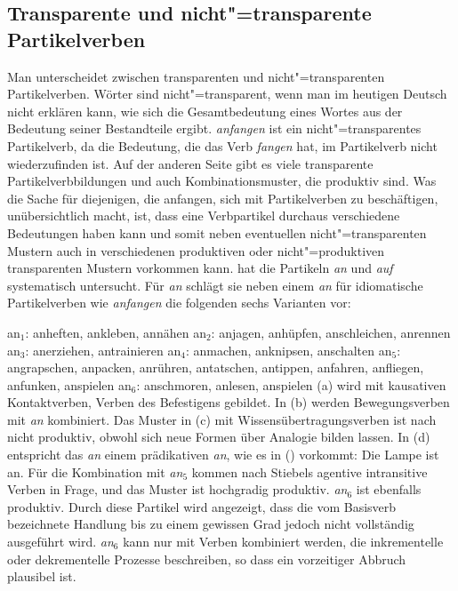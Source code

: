 \subsection{Transparente und nicht"=transparente Partikelverben}
\label{sec-transparente-und-nicht-transparente-Partikelverben}

Man unterscheidet zwischen transparenten und nicht"=transparenten Partikelverben. Wörter
sind nicht"=transparent, wenn man im heutigen Deutsch nicht erklären kann, wie sich die
Gesamtbedeutung eines Wortes aus der Bedeutung seiner Bestandteile ergibt. \emph{anfangen}
ist \zb ein nicht"=transparentes Partikelverb, da die Bedeutung, die das Verb \emph{fangen}
hat, im Partikelverb nicht wiederzufinden ist. Auf der anderen Seite gibt es viele transparente
Partikelverbbildungen und auch Kombinationsmuster, die produktiv sind. Was die Sache
für diejenigen, die anfangen, sich mit Partikelverben zu beschäftigen, unübersichtlich macht, ist,
dass eine Verbpartikel durchaus verschiedene Bedeutungen haben kann und somit
neben eventuellen nicht"=transparenten Mustern auch in verschiedenen
produktiven oder nicht"=produktiven transparenten Mustern vorkommen kann.
\citet{Stiebels96a} hat die Partikeln \emph{an} und \emph{auf} systematisch untersucht.
Für \emph{an} schlägt sie neben einem \emph{an} für idiomatische Partikelverben wie \emph{anfangen}
die folgenden sechs Varianten vor:

\eal
\label{verschiedene-ans}
\ex an$_1$: anheften, ankleben, annähen                           
\ex an$_2$: anjagen,  anhüpfen, anschleichen, anrennen            
\ex an$_3$: anerziehen, antrainieren                              
\ex an$_4$: anmachen, anknipsen, anschalten                       
\ex an$_5$: angrapschen, anpacken, anrühren, antatschen, antippen,
            anfahren, anfliegen, anfunken, anspielen              
\ex an$_6$: anschmoren, anlesen, anspielen                        
\zl
(a) wird mit kausativen Kontaktverben, Verben des Befestigens gebildet. In
(b)
werden Bewegungsverben mit \emph{an} kombiniert. Das Muster in (c) mit Wissensübertragungsverben
ist nach \citet[]{Stiebels96a} nicht produktiv, obwohl sich neue Formen über Analogie bilden lassen.
In (d) entspricht das \emph{an} einem prädikativen \emph{an}, wie es in () vorkommt:
\ea
Die Lampe ist an.
\z
Für die Kombination mit \emph{an$_5$} kommen nach Stiebels agentive intransitive Verben in Frage,
und das Muster ist hochgradig produktiv.
\emph{an$_6$} ist ebenfalls produktiv. Durch diese Partikel wird angezeigt, dass die vom Basisverb
bezeichnete Handlung bis zu einem gewissen Grad jedoch nicht vollständig ausgeführt
wird. \emph{an$_6$} kann nur mit Verben kombiniert werden, die inkrementelle oder dekrementelle
Prozesse beschreiben, so dass ein vorzeitiger Abbruch plausibel ist.


